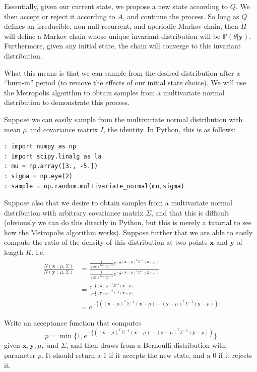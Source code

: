 Essentially, given our current state, we propose a new state according to $Q$. We then accept or reject it according to $A$, and continue the process. So long as $Q$ defines an irreducible, non-null recurrent, and aperiodic Markov chain, then $H$ will define a Markov chain whose unique invariant distribution will be $\mathbb{P}(\theta | \mathbf{y})$. Furthermore, given any initial state, the chain will converge to this invariant distribution.

What this means is that we can sample from the desired distribution after a ``burn-in'' period (to remove the effects of our initial state choice). We will use the Metropolis algorithm to obtain samples from a multivariate normal distribution to demonstrate this process.

Suppose we can easily sample from the multivariate normal distribution with mean $\mu$ and covariance matrix $I$, the identity. In Python, this is as follows:
\begin{lstlisting}
: import numpy as np
: import scipy.linalg as la
: mu = np.array([3., -5.])
: sigma = np.eye(2)
: sample = np.random.multivariate_normal(mu,sigma)
\end{lstlisting}

Suppose also that we desire to obtain samples from a multivariate normal distribution with arbitrary covariance matrix $\Sigma$, and that this is difficult (obviously we can do this directly in Python, but this is merely a tutorial to see how the Metropolis algorithm works). Suppose further that we are able to easily compute the ratio of the density of this distribution at two points $\mathbf{x}$ and $\mathbf{y}$ of length $K$, i.e.
\begin{align*}
\frac{N(\mathbf{x} \; ; \; \mu, \Sigma)}{N(\mathbf{y} \; ; \; \mu, \Sigma)} & = \frac{\frac{1}{(2\pi)^{K/2}|\Sigma|^{1/2}} e^{-\frac{1}{2}(\mathbf{x} - \mu)^{T} \Sigma^{-1} (\mathbf{x} - \mu)}}{\frac{1}{(2\pi)^{K/2}|\Sigma|^{1/2}} e^{-\frac{1}{2}(\mathbf{y} - \mu)^{T} \Sigma^{-1} (\mathbf{x} - \mu)}} \\
& = \frac{e^{-\frac{1}{2}(\mathbf{x} - \mu)^{T} \Sigma^{-1} (\mathbf{x} - \mu)}}{e^{-\frac{1}{2}(\mathbf{y} - \mu)^{T} \Sigma^{-1} (\mathbf{x} - \mu)}} \\
& = e^{-\frac{1}{2}\left((\mathbf{x} - \mu)^{T} \Sigma^{-1} (\mathbf{x} - \mu) - (\mathbf{y} - \mu)^{T} \Sigma^{-1} (\mathbf{y} - \mu)\right)}
\end{align*}

\begin{problem} \label{problem1}
Write an acceptance function that computes 
\begin{equation*}
p = \min \{1, e^{-\frac{1}{2}\left((\mathbf{x} - \mu)^{T} \Sigma^{-1} (\mathbf{x} - \mu) - (\mathbf{y} - \mu)^{T} \Sigma^{-1} (\mathbf{y} - \mu)\right)}\}
\end{equation*}
given $\mathbf{x}, \mathbf{y}, \mu,$ and $\Sigma$, and then draws from a Bernoulli distribution with parameter $p$. It should return a $1$ if it accepts the new state, and a $0$ if it rejects it.
\end{problem}


